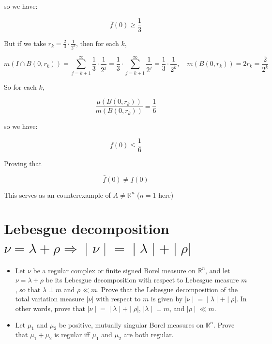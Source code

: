 \begin{example}
so we have:

\[\bar{f}(0) \geq \frac{1}{3}\]

But if we take \(r_{k} = \frac{2}{3} \cdot \frac{1}{2^{k}}\), then for each \(k\),

\[m(I \cap B(0,r_{k})) = \sum\limits_{j = k + 1}^{\infty}\frac{1}{3} \cdot \frac{1}{2^{j}} = \frac{1}{3} \cdot \sum\limits_{j = k + 1}^{\infty}\frac{1}{2^{j}} = \frac{1}{3} \cdot \frac{1}{2^{k}},\quad m(B\left( {0,r_{k}} \right)) = 2r_{k} = \frac{2}{2^{k}}\]

So for each \(k\),

\[\frac{\mu(B(0,r_{k}))}{m(B(0,r_{k}))} = \frac{1}{6}\]

so we have:

\[\underline{f}(0) \leq \frac{1}{6}\]

Proving that

\[\bar{f}(0) \neq \underline{f}(0)\]

This serves as an counterexample of \(A \neq \mathbb{R}^{n}\) (\(n = 1\) here)

\end{example}

\section{\texorpdfstring{Lebesgue decomposition \(\left. \nu = \lambda + \rho\Longrightarrow \middle| \nu \middle| = \middle| \lambda \middle| + \middle| \rho| \right.\)}{Lebesgue decomposition \textbackslash left. \textbackslash nu = \textbackslash lambda + \textbackslash rho\textbackslash Longrightarrow \textbackslash middle\textbar{} \textbackslash nu \textbackslash middle\textbar{} = \textbackslash middle\textbar{} \textbackslash lambda \textbackslash middle\textbar{} + \textbackslash middle\textbar{} \textbackslash rho\textbar{} \textbackslash right.}}\label{lebesgue-decomposition-nulambdarhoimplies-nulambdarho}

\begin{itemize}
\item
  Let \(\nu\) be a regular complex or finite signed Borel measure on \(\mathbb{R}^{n}\), and let \(\nu = \lambda + \rho\) be its Lebesgue decomposition with respect to Lebesgue measure \(m\), so that \(\lambda \perp m\) and \(\rho \ll m\). Prove that the Lebesgue decomposition of the total variation measure \(|\nu|\) with respect to \(m\) is given by \(\left. |\nu \middle| = \middle| \lambda \middle| + \middle| \rho| \right.\). In other words, prove that \(\left. |\nu \middle| = \middle| \lambda \middle| + \middle| \rho| \right.\), \(\left. |\lambda \middle| \perp m \right.\), and \(\left. |\rho \middle| \ll m \right.\).
\item
  Let \(\mu_{1}\) and \(\mu_{2}\) be positive, mutually singular Borel measures on \(\mathbb{R}^{n}\). Prove that \(\mu_{1} + \mu_{2}\) is regular iff \(\mu_{1}\) and \(\mu_{2}\) are both regular.
\end{itemize}

